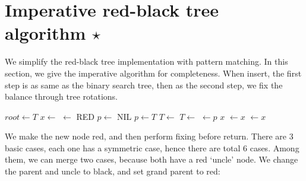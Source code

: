 \documentclass[b5paper]{article}
\begin{document}
\section{Imperative red-black tree algorithm $\star$}

We simplify the red-black tree implementation with pattern matching. In this section, we give the imperative algorithm for completeness. When insert, the first step is as same as the binary search tree, then as the second step, we fix the balance through tree rotations.

\begin{algorithmic}[1]
  \State $root \gets T$
  \State $x \gets$ 
  \State {} $\gets$ RED
  \State $p \gets$ NIL
    \State $p \gets T$
      \State $T \gets $ 
    \Else
      \State $T \gets $ 
    \EndIf
  \EndWhile
  \State {} $\gets p$
   
    \State \Return $x$
    \State {} $\gets x$
  \Else
    \State {} $\gets x$
  \EndIf
  \State \Return {}
\EndFunction
\end{algorithmic}

We make the new node red, and then perform fixing before return. There are 3 basic cases, each one has a symmetric case, hence there are total 6 cases. Among them, we can merge two cases, because both have a red `uncle' node. We change the parent and uncle to black, and set grand parent to red:
\end{document}
